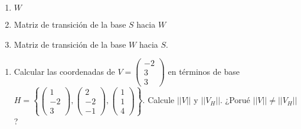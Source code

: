 \documentclass[
  11,
]{article}
\providecommand{\tightlist}{%
  \setlength{\itemsep}{0pt}\setlength{\parskip}{0pt}}
\begin{document}
\begin{enumerate}
\def\labelenumi{\alph{enumi})}
\tightlist
\item
  \(W\)
\item
  Matriz de transición de la base \(S\) hacia \(W\)
\item
  Matriz de transición de la base \(W\) hacia \(S\).
\end{enumerate}

\begin{enumerate}
\def\labelenumi{\arabic{enumi}.}
\setcounter{enumi}{8}
\tightlist
\item
  Calcular las coordenadas de
  \(V = \begin{pmatrix} -2 \\ 3 \\ 3 \end{pmatrix}\) en términos de base
  \(H = \left\{ \begin{pmatrix} 1 \\ -2 \\3 \end{pmatrix}, \begin{pmatrix}2 \\ -2 \\ -1 \end{pmatrix}, \begin{pmatrix}1\\1\\4\end{pmatrix} \right\}\).
  Calcule \(||V||\) y \(||V_H||\). ¿Porué \(||V|| \ne ||V_H||\)?
\end{enumerate}
\end{document}

